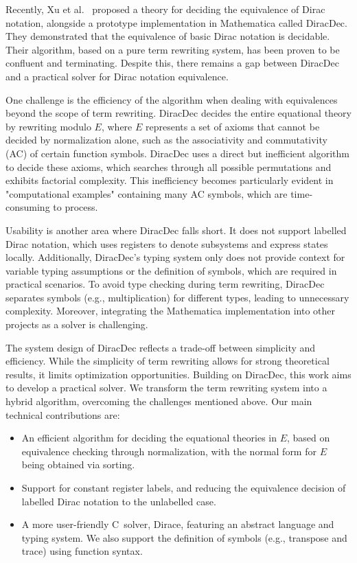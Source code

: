 \documentclass[runningheads]{llncs}
\newcommand{\CC}{C\nolinebreak\hspace{-.05em}\raisebox{.4ex}{\tiny\bf +}\nolinebreak\hspace{-.10em}\raisebox{.4ex}{\tiny\bf +}}
\def\CC{{C\nolinebreak[4]\hspace{-.05em}\raisebox{.4ex}{\tiny\bf ++}}}
\begin{document}
Recently, Xu et al.~\cite{diracdec} proposed a theory for deciding the equivalence of Dirac notation, alongside a prototype implementation in Mathematica called DiracDec. They demonstrated that the equivalence of basic Dirac notation is decidable. Their algorithm, based on a pure term rewriting system, has been proven to be confluent and terminating. Despite this, there remains a gap between DiracDec and a practical solver for Dirac notation equivalence.

One challenge is the efficiency of the algorithm when dealing with equivalences beyond the scope of term rewriting. DiracDec decides the entire equational theory by rewriting modulo \( E \), where \( E \) represents a set of axioms that cannot be decided by normalization alone, such as the associativity and commutativity (AC) of certain function symbols. DiracDec uses a direct but inefficient algorithm to decide these axioms, which searches through all possible permutations and exhibits factorial complexity. This inefficiency becomes particularly evident in "computational examples" containing many AC symbols, which are time-consuming to process.

Usability is another area where DiracDec falls short. It does not support labelled Dirac notation, which uses registers to denote subsystems and express states locally. Additionally, DiracDec's typing system only does not provide context for variable typing assumptions or the definition of symbols, which are required in practical scenarios. To avoid type checking during term rewriting, DiracDec separates symbols (e.g., multiplication) for different types, leading to unnecessary complexity. Moreover, integrating the Mathematica implementation into other projects as a solver is challenging.

The system design of DiracDec reflects a trade-off between simplicity and efficiency. While the simplicity of term rewriting allows for strong theoretical results, it limits optimization opportunities. Building on DiracDec, this work aims to develop a practical solver. We transform the term rewriting system into a hybrid algorithm, overcoming the challenges mentioned above. Our main technical contributions are:
\begin{itemize}
    \item An efficient algorithm for deciding the equational theories in \( E \), based on equivalence checking through normalization, with the normal form for \( E \) being obtained via sorting.
    \item Support for constant register labels, and reducing the equivalence decision of labelled Dirac notation to the unlabelled case.
    \item A more user-friendly \CC\ solver, Dirace, featuring an abstract language and typing system. We also support the definition of symbols (e.g., transpose and trace) using function syntax.
\end{itemize}
\end{document}
